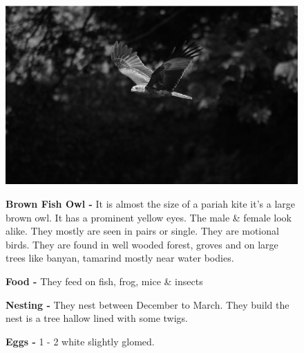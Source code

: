 \begin{figure}[H]
\begin{center}
\includegraphics{figure/Land_birds/01_pariah_kite/pariah-kite.eps}
\end{center}
\medskip
\noindent
{\bf Brown Fish Owl -} It is almost the size of a pariah kite it's a large brown owl. It has a prominent yellow eyes. The male \& female look alike. They mostly are seen in pairs or single. They are motional birds. They are found in well wooded  forest, groves and on large trees like banyan, tamarind mostly near water bodies.

\medskip
{\bf Food -} They feed on fish, frog, mice \& insects

{\bf Nesting -} They nest between December to March. They build the nest is a tree hallow lined with some twigs.

{\bf Eggs -} 1 - 2 white slightly glomed.
\end{figure}

\vfill\eject

~\phantom{a}
\vfill

